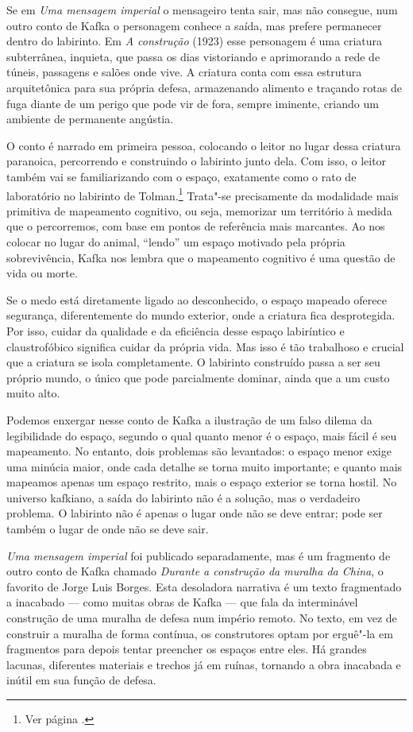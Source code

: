 Se em \emph{Uma mensagem imperial} o mensageiro tenta sair, mas não
consegue, num outro conto de Kafka o personagem conhece a saída, mas
prefere permanecer dentro do labirinto. Em \emph{A construção} (1923) \label{construcao}
esse personagem é uma criatura subterrânea, inquieta, que passa os dias
vistoriando e aprimorando a rede de túneis, passagens e salões onde
vive. A criatura conta com essa estrutura arquitetônica para sua própria
defesa, armazenando alimento e traçando rotas de fuga diante de um
perigo que pode vir de fora, sempre iminente, criando um ambiente de
permanente angústia.

O conto é narrado em primeira pessoa, colocando o leitor no lugar dessa
criatura paranoica, percorrendo e construindo o labirinto junto dela. Com
isso, o leitor também vai se familiarizando com o espaço, exatamente
como o rato de laboratório no labirinto de Tolman.\footnote{Ver página \pageref{tolman}.} Trata"-se precisamente
da modalidade mais primitiva de mapeamento cognitivo, ou seja, memorizar
um território à medida que o percorremos, com base em pontos de
referência mais marcantes. Ao nos colocar no lugar do animal, ``lendo''
um espaço motivado pela própria sobrevivência, Kafka nos lembra que o
mapeamento cognitivo é uma questão de vida ou morte.

Se o medo está diretamente ligado ao desconhecido, o espaço mapeado
oferece segurança, diferentemente do mundo exterior, onde a criatura
fica desprotegida. Por isso, cuidar da qualidade e da eficiência desse
espaço labiríntico e claustrofóbico significa cuidar da própria vida.
Mas isso é tão trabalhoso e crucial que a criatura se isola
completamente. O labirinto construído passa a ser seu próprio mundo, o
único que pode parcialmente dominar, ainda que a um custo muito alto.

Podemos enxergar nesse conto de Kafka a ilustração de um falso dilema da
legibilidade do espaço, segundo o qual quanto menor é o espaço, mais
fácil é seu mapeamento. No entanto, dois problemas são levantados: o
espaço menor exige uma minúcia maior, onde cada detalhe se torna muito
importante; e quanto mais mapeamos apenas um espaço restrito\emph{,}
mais o espaço exterior se torna hostil. No universo kafkiano, a saída do
labirinto não é a solução, mas o verdadeiro problema. O labirinto não é
apenas o lugar onde não se deve entrar; pode ser também o lugar de onde
não se deve sair.

\emph{Uma mensagem imperial} foi publicado separadamente, mas é um
fragmento de outro conto de Kafka chamado \emph{Durante a construção da
muralha da China}, o favorito de Jorge Luis Borges. Esta desoladora
narrativa é um texto fragmentado a inacabado --- como muitas obras de
Kafka --- que fala da interminável construção de uma muralha de defesa
num império remoto. No texto, em vez de construir a muralha de forma
contínua, os construtores optam por erguê"-la em fragmentos para depois
tentar preencher os espaços entre eles. Há grandes lacunas, diferentes
materiais e trechos já em ruínas, tornando a obra inacabada e inútil em
sua função de defesa.

